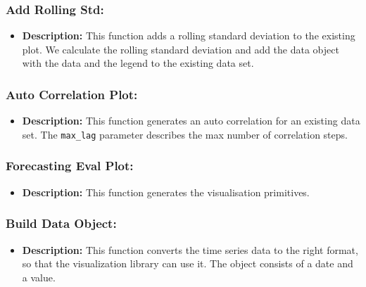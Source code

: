 \documentclass[11pt, a4paper]{article}
\begin{document}
\subsubsection*{Add Rolling Std:}
\begin{itemize}
 \item[] \textbf{Description:} This function adds a rolling standard deviation to the existing plot. 
 We calculate the rolling standard deviation and add the data object with the data and the legend to the existing data set.
\end{itemize}


\subsubsection*{Auto Correlation Plot:}
\begin{itemize}
 \item[] \textbf{Description:} This function generates an auto correlation for an existing data set. The \texttt{max\_lag} parameter 
 describes the max number of correlation steps.
\end{itemize}


\subsubsection*{Forecasting Eval Plot:}
\begin{itemize}
 \item[] \textbf{Description:} This function generates the visualisation primitives.
\end{itemize}


\subsubsection*{Build Data Object:}
\begin{itemize}
 \item[] \textbf{Description:} This function converts the time series data to the right format, so that the visualization library can use it. The object consists of a date and a value.
\end{itemize}
\end{document}
